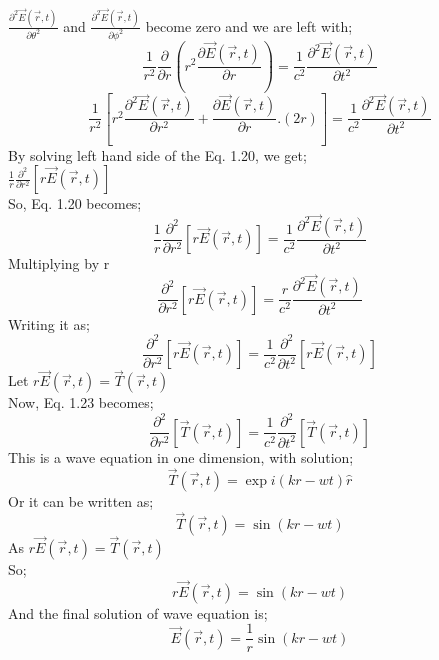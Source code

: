 \documentclass[a4paper, twoside] {thesis}
\begin{document}
$\frac{\partial^2\vec{E}(\vec{r},t)}{\partial \theta^2}$ and $\frac{\partial^2\vec{E}(\vec{r},t)}{\partial \phi^2}$ become zero and we are left with;\\
\begin{equation}
\frac{1}{r^2}\frac{\partial}{\partial r}(r^2\frac{\partial\vec{E}(\vec{r},t) }{\partial r}) = \frac{1}{c^2}\frac{\partial^2\vec{E}(\vec{r},t)}{\partial t^2}
\end{equation}
\begin{equation}
\frac{1}{r^2}[r^2\frac{\partial^2\vec{E}(\vec{r},t)}{\partial r^2}+\frac{\partial\vec{E}(\vec{r},t) }{\partial r}.(2r)] = \frac{1}{c^2}\frac{\partial^2\vec{E}(\vec{r},t)}{\partial t^2}
\end{equation}
By solving left hand side of the Eq. 1.20, we get;\\
 $\frac{1}{r}\frac{\partial^2}{\partial r^2}[r\vec{E}(\vec{r},t)]$\\
So, Eq. 1.20 becomes;\\
\begin{equation}
\frac{1}{r}\frac{\partial^2}{\partial r^2}[r\vec{E}(\vec{r},t)] = \frac{1}{c^2}\frac{\partial^2\vec{E}(\vec{r},t)}{\partial t^2} 
\end{equation}
Multiplying by r\\
\begin{equation}
\frac{\partial^2}{\partial r^2}[r\vec{E}(\vec{r},t)] = \frac{r}{c^2}\frac{\partial^2\vec{E}(\vec{r},t)}{\partial t^2} 
\end{equation}
Writing it as;\\
\begin{equation}
\frac{\partial^2}{\partial r^2}[r\vec{E}(\vec{r},t)] = \frac{1}{c^2}\frac{\partial^2}{\partial t^2}[r\vec{E}(\vec{r},t)]
\end{equation}
Let $r\vec{E}(\vec{r},t) = \vec{T}(\vec{r},t)$\\
Now, Eq. 1.23 becomes;\\
\begin{equation}
\frac{\partial^2}{\partial r^2}[\vec{T}(\vec{r},t)] = \frac{1}{c^2}\frac{\partial^2}{\partial t^2}[\vec{T}(\vec{r},t)]
\end{equation}
This is a wave equation in one dimension, with solution;\\
\begin{equation}
\vec{T}(\vec{r},t) = \exp{i(kr-wt)}\hat{r}
\end{equation}
Or it can be written as;\\
\begin{equation}
\vec{T}(\vec{r},t) = \sin(kr-wt)
\end{equation}
As $r\vec{E}(\vec{r},t) = \vec{T}(\vec{r},t)$\\
So;\\
\begin{equation}
r\vec{E}(\vec{r},t) = \sin(kr-wt)
\end{equation}
And the final solution of wave equation is;\\
\begin{equation}
\vec{E}(\vec{r},t) = \frac{1}{r}\sin(kr-wt)
\end{equation}
\end{document}
